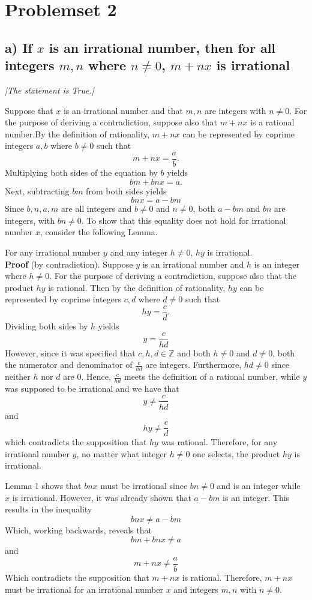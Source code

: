 \documentclass[11pt, letterpaper]{article}
\begin{document}
\section*{Problemset 2}

\subsection*{a) If $x$ is an irrational number, then for all integers $m,n$ where $n\neq 0$, $m+nx$ is irrational}
{\large\it |The statement is True.|}
\begin{prf}[by contradiction]
    Suppose that $x$ is an irrational number and that $m,n$ are integers with $n\neq 0$. For the purpose of deriving a contradiction,
     suppose also that $m+nx$ is a rational number.By the definition of rationality, $m+nx$ can be represented by coprime integers $a,b$ where $b\neq 0$ such that
    \[m+nx=\frac{a}{b}\text{.}\]
    Multiplying both sides of the equation by $b$ yields
    \[bm+bnx=a\text{.}\]
    Next, subtracting $bm$ from both sides yields
    \[bnx=a-bm\]
    Since $b,n,a,m$ are all integers and $b\neq 0$ and $n\neq 0$, both $a-bm$ and $bn$ are integers, with $bn\neq 0$.
    To show that this equality does not hold for irrational number $x$, consider the following Lemma.\\[0.5cm]
    \begin{lemma}
        For any irrational number $y$ and any integer $h\neq 0$, $hy$ is irrational.\\
        {\bf Proof} (by contradiction). Suppose $y$ is an irrational number and $h$ is an integer where $h\neq 0$.
        For the purpose of deriving a contradiction, suppose also that the product $hy$ is rational. Then by the definition of 
        rationality, $hy$ can be represented by coprime integers $c,d$ where $d\neq 0$ such that
        \[hy=\frac{c}{d}\text{.}\]
        Dividing both sides by $h$ yields
        \[y=\frac{c}{hd}\]
        However, since it was specified that $c,h,d \in \mathbb{Z}$ and both $h\neq 0$ and $d\neq 0$, both the numerator and denominator of $\frac{c}{hd}$ are integers. Furthermore,
        $hd\neq 0$ since neither $h$ nor $d$ are 0. Hence, $\frac{c}{hd}$ meets the definition of a rational number, while $y$ was supposed to be irrational and we have that 
        \[y\neq \frac{c}{hd}\]
        and
        \[hy\neq \frac{c}{d}\]
        which contradicts the supposition that $hy$ was rational. Therefore, for any irrational number $y$, 
        no matter what integer $h\neq 0$ one selects, the product $hy$ is irrational.\\[0.5cm]
    \end{lemma}
    \noindent Lemma 1 shows that $bnx$ must be irrational since $bn\neq 0$ and is an integer while $x$ is irrational. However, it was already shown that
    $a-bm$ is an integer. This results in the inequality
    \[bnx\neq a-bm\]
    Which, working backwards, reveals that 
    \[bm+bnx\neq a\]
    and
    \[m+nx\neq \frac{a}{b}\]
    Which contradicts the supposition that $m+nx$ is rational. Therefore, $m+nx$ must be irrational for an irrational number $x$ and integers $m,n$ with $n\neq 0$.
\end{prf}
\end{document}

